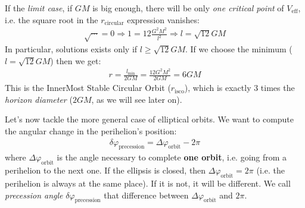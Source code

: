 \documentclass[../template.tex]{subfiles}
\begin{document}
If the \textit{limit case}, if $GM$ is big enough, there will be only \textit{one critical point} of $V_{\mathrm{eff}}$, i.e. the square root in the $r_{\mathrm{circular}}$ expression vanishes:
\begin{align*}
    \sqrt{\cdots } = 0 \Rightarrow 1= 12 \frac{G^2 M^2}{l^2} \Rightarrow l= \sqrt{12} GM  
\end{align*}     
In particular, solutions exists only if $l \geq \sqrt{12} GM$. If we choose the minimum ($l = \sqrt{12} GM$) then we get:
\begin{align*}
    r= \frac{l_{\mathrm{min} }}{2 GM} = \frac{12 G^2 M^2}{2 GM} = 6 GM  
\end{align*} 
This is the InnerMost Stable Circular Orbit ($r_{\mathrm{isco} }$), which is exactly $3$ times the \textit{horizon diameter} ($2GM$, as we will see later on).  


Let's now tackle the more general case of elliptical orbits. We want to compute the angular change in the perihelion's position:
\begin{align*}
    \delta \varphi_{\mathrm{precession}} = \Delta \varphi_{\mathrm{orbit} } - 2 \pi
\end{align*}
where $\Delta \varphi_{\mathrm{orbit} }$ is the angle necessary to complete \textbf{one orbit}, i.e. going from a perihelion to the next one. If the ellipsis is closed, then $\Delta \varphi_{\mathrm{orbit} } = 2 \pi$ (i.e. the perihelion is always at the same place). If it is not, it will be different. We call \textit{precession angle} $\delta \varphi_\mathrm{precession} $ that difference between $\Delta \varphi_{\mathrm{orbit} }$ and $2 \pi$.
\end{document}
